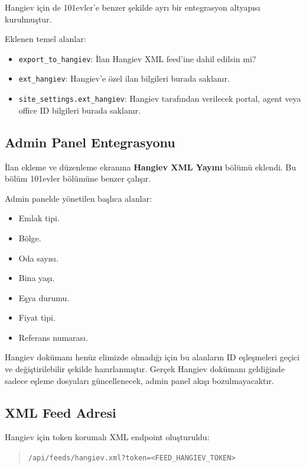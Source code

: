 \documentclass[11pt,a4paper]{article}
\newcommand{\portal}[1]{\textbf{#1}}
\newcommand{\code}[1]{\texttt{#1}}
\begin{document}
Hangiev için de 101evler'e benzer şekilde ayrı bir entegrasyon altyapısı kurulmuştur.

Eklenen temel alanlar:

\begin{itemize}
  \item \code{export\_to\_hangiev}: İlan Hangiev XML feed'ine dahil edilsin mi?
  \item \code{ext\_hangiev}: Hangiev'e özel ilan bilgileri burada saklanır.
  \item \code{site\_settings.ext\_hangiev}: Hangiev tarafından verilecek portal, agent veya office ID bilgileri burada saklanır.
\end{itemize}

\subsection{Admin Panel Entegrasyonu}

İlan ekleme ve düzenleme ekranına \portal{Hangiev XML Yayını} bölümü eklendi. Bu bölüm 101evler bölümüne benzer çalışır.

Admin panelde yönetilen başlıca alanlar:

\begin{itemize}
  \item Emlak tipi.
  \item Bölge.
  \item Oda sayısı.
  \item Bina yaşı.
  \item Eşya durumu.
  \item Fiyat tipi.
  \item Referans numarası.
\end{itemize}

Hangiev dokümanı henüz elimizde olmadığı için bu alanların ID eşleşmeleri geçici ve değiştirilebilir şekilde hazırlanmıştır. Gerçek Hangiev dokümanı geldiğinde sadece eşleme dosyaları güncellenecek, admin panel akışı bozulmayacaktır.

\subsection{XML Feed Adresi}

Hangiev için token korumalı XML endpoint oluşturuldu:

\begin{quote}
\code{/api/feeds/hangiev.xml?token=<FEED\_HANGIEV\_TOKEN>}
\end{quote}
\end{document}
